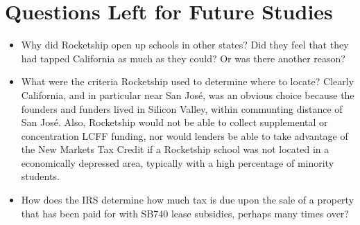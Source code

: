 \section{Questions Left for Future Studies}\label{sec:future-studies}
\begin{itemize}
  \item Why did Rocketship open up schools in other states? Did they feel that they had tapped California as much as they could? Or was there another reason?
  \item What were the criteria Rocketship used to determine where to locate? Clearly California, and in particular near San José, was an obvious choice because the founders and funders lived in Silicon Valley, within communting distance of San José. Also, Rocketship would not be able to collect supplemental or concentration LCFF funding, nor would lenders be able to take advantage of the New Markets Tax Credit if a Rocketship school was not located in a economically depressed area, typically with a high percentage of minority students.
  \item How does the IRS determine how much tax is due upon the sale of a property that has been paid for with SB740 lease subsidies, perhaps many times over?
\end{itemize}

\begin{comment}
\subsection{Validity}
  \subsection{Reliability}
  \subsection{Limitations}
  \section{Evaluating the Results}
  \section{Rival Explanations}
  \section{Future Research}
\end{comment}



